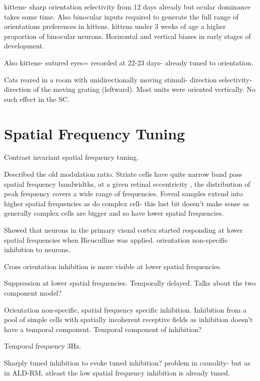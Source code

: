 \documentclass {report}
\begin{document}
\cite{Fregnac1978} kittens- sharp orientation selectivity from 12 days already but ocular dominance takes some time. Also binocular inputs required to generate the full range of orientations preferences in kittens. kittens under 3 weeks of age a higher proportion of binocular neurons. Horizontal and vertical biases in early stages of development.

\cite{Sherk1975} Also kittens- sutured eyes= recorded at 22-23 days- already tuned to orientation. 

\cite{Cynader1975} Cats reared in a room with unidirectionally moving stimuli- direction selectivity- direction of the moving grating (leftward). Most units were oriented vertically. No such effect in the SC. 

\section*{Spatial Frequency Tuning}

\cite{Skottun1987} Contrast invariant spatial frequency tuning. 

\cite{DeValois1982a} Described the old modulation ratio. Striate cells have quite narrow band pass spatial frequency bandwidths, at a given retinal eccentricity , the distribution of peak frequency covers a wide range of frequencies.  Foveal samples extend into higher spatial frequencies as do complex cell- this last bit doesn't make sense as generally complex cells are bigger and so have lower spatial frequencies.

\cite{Vidyasagar1994a} Showed that neurons in the primary visual cortex started responding at lower spatial frequencies when Bicuculline was applied. orientation non-specific inhibition to neurons.

\cite{Meese2004} Cross orientation inhibition is more visible at lower spatial frequencies.

\cite{Bredfeldt2002a} Suppression at lower spatial frequencies. Temporally delayed. Talks about the two component model?

\cite{Bauman1991} Orientation non-specific, spatial frequency specific inhibition.  Inhibition from a pool of simple cells with spatially incoherent receptive fields as inhibition doesn't have a temporal component. Temporal component of inhibition?

Temporal frequency 3Hz.

Sharply tuned inhibition to evoke tuned inhibition? problem in causality- but as in ALD-RM, atleast the low spatial frequency inhibition is already tuned. 
\end{document}

